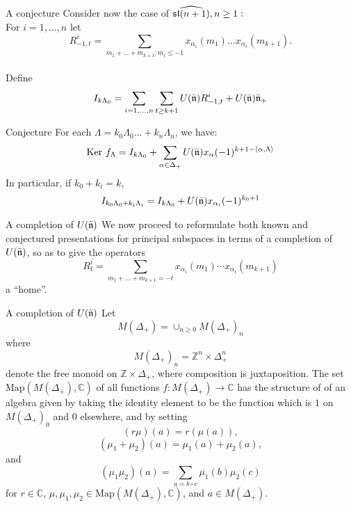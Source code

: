 \documentclass{beamer}
\begin{document}
\begin{frame}{A conjecture}
Consider now the case of $\widehat{\frak{sl}(n+1)}, n \ge 1:$\\
\pause
For $i=1, \dots, n$ let  
$$R_{-1,t}^i = \sum_{m_1 + \dots + m_{k+1}; m_i \le -1}x_{\alpha_i}(m_1) \dots x_{\alpha_i}(m_{k+1}).$$ \\
\pause
Define
$$I_{k\Lambda_0} = \sum_{i=1,\dots, n}\sum_{t \ge k+1} U(\bar{\frak{n}}) R_{-1,t}^i + U(\bar{\frak{n}})\bar{\frak{n}}_+$$
\begin{alertblock}{Conjecture}\small
For each $\Lambda = k_0\Lambda_0 \dots + k_n\Lambda_n$, we have: \begin{equation*}
\mbox{Ker }f_{\Lambda} = I_{k\Lambda_0} +  \sum_{\alpha \in \Delta_+}U(\bar{\frak{n}})x_{\alpha}(-1)^{k+1 - \langle \alpha, \Lambda \rangle}
\end{equation*}
In particular, if $k_0 + k_i = k$,
\begin{eqnarray*}
 I_{k_0 \Lambda_0 + k_i \Lambda_i} = I_{k\Lambda_0} + U(\bar{\frak{n}})x_{\alpha_i}(-1)^{k_0+1}
\end{eqnarray*}
\end{alertblock}
\end{frame}

\begin{frame}{A completion of $U(\bar{\frak{n}})$}
We now proceed to reformulate both known and conjectured presentations for principal subspaces in
terms of a completion of $U(\bar{\frak{n}})$, so as to give the operators
$$
R_t^i = \sum_{m_1 + \dots +m_{k+1} = -t}x_{\alpha_i}(m_1)\cdots x_{\alpha_i}(m_{k+1})
$$
a ``home''.
\end{frame}



\begin{frame}{A completion of $U(\bar{\frak{n}})$}
 Let 
 $$
M(\Delta_+) = \cup_{n \ge 0} M(\Delta_+)_n
$$
where
$$
M(\Delta_+)_n = \mathbb{Z}^n \times \Delta_+^n
$$
denote the free monoid on $\mathbb{Z} \times \Delta_+$, where composition is juxtaposition.
\pause
The set $\mbox{Map}(M(\Delta_+),\mathbb{C})$ of all functions
$f: M(\Delta_+) \longrightarrow \mathbb{C}$
 has the structure of of an algebra given by taking the identity
element to be the function which is $1$ on $M(\Delta_+)_0$ and $0$ elsewhere,
and by setting
$$
(r\mu)(a) = r(\mu(a)),
$$
$$
(\mu_1 + \mu_2)(a) = \mu_1(a) + \mu_2(a),
$$
and
$$
(\mu_1\mu_2)(a) = \sum_{a = b \circ c} \mu_1(b) \mu_2(c)
$$ for $r \in \mathbb{C}$, $\mu, \mu_1, \mu_2 \in
\mbox{Map}(M(\Delta_+),\mathbb{C})$, and $a \in M(\Delta_+)$.
 \end{frame}
\end{document}
